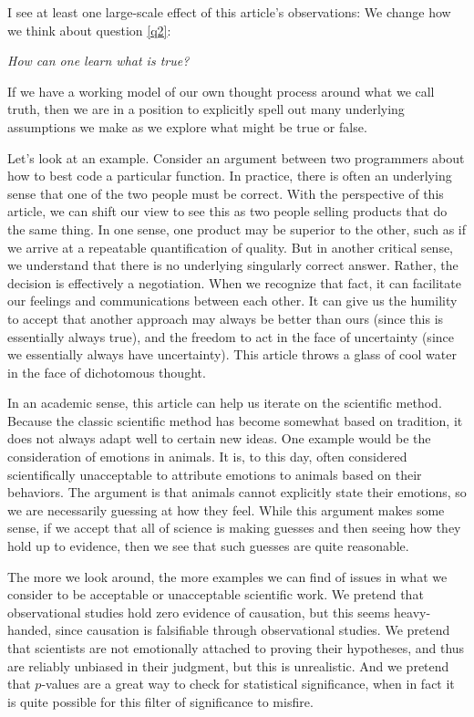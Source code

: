 \documentclass[11pt, oneside]{article}   	%
\begin{document}
I see at least one large-scale effect of this article's observations:
We change how we think about question \ref{q2}:

\centerline{\em How can one learn what is true?}

If we have a working model of our own thought process around what we call truth,
then we are in a position to explicitly spell out many underlying assumptions we
make as we explore what might be true or false.

Let's look at an example. 
Consider an argument between two programmers about how to best code a
particular function.
In practice, there is often an underlying sense that one
of the two people must be correct.
With the perspective of this article, we can
shift our view to see this as two people selling products that do the same
thing.
In one sense, one product may be superior to the other, such as if we
arrive at a repeatable quantification of quality.
But in another critical
sense, we understand that there is no underlying singularly correct answer.
Rather, the decision is effectively a negotiation.
When we recognize that fact, it
can facilitate our feelings and communications between each other.
It can give
us the humility to accept that another approach may always be better than ours
(since this is essentially always true), and the freedom to act in the face of
uncertainty (since we essentially always have uncertainty).
This
article throws
a glass of cool water in the face of dichotomous thought.

In an academic sense, this article can help us iterate on the scientific method.
Because the classic scientific method has become somewhat based on tradition,
it does
not always adapt well to certain new ideas.
One example would be the consideration of emotions in animals.
It is, to this day, often considered scientifically unacceptable to attribute
emotions to animals based on their behaviors. The argument is that animals
cannot explicitly state their emotions, so we are necessarily guessing at how
they feel. While this argument makes some sense, if we accept that all of
science is making guesses and then seeing how they hold up to evidence, then we
see that such guesses are quite reasonable.

The more we look around, the more examples we can find of issues in what we
consider to be acceptable or unacceptable scientific work.
We pretend that observational studies hold zero evidence of causation, but this
seems heavy-handed, since causation is falsifiable through observational
studies. We pretend that scientists are not emotionally attached to proving
their hypotheses, and thus are reliably unbiased in their judgment, but this is
unrealistic. And we pretend that $p$-values are a great way to check for
statistical significance, when in fact it is quite possible for this filter of
significance to misfire.
\end{document}
